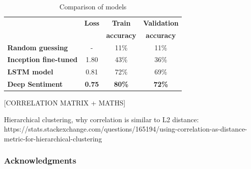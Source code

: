 \documentclass{article} %
\begin{document}
\begin{table}[H]
\caption{Comparison of models}
\begin{center}
    \begin{tabular}{ l | c | c | c}
    & \textbf{Loss} & \textbf{Train} & \textbf{Validation} \\
    & & \textbf{accuracy} & \textbf{accuracy} \\ \hline
    \textbf{Random guessing} & - & 11\% & 11\% \\ \hline
    \textbf{Inception fine-tuned}  & 1.80 & 43\% & 36\% \\ \hline
    \textbf{LSTM model} & 0.81 & 72\% & 69\% \\ \hline
    \textbf{Deep Sentiment} & \textbf{0.75} & \textbf{80\%} & \textbf{72\%} \\
    \end{tabular}
\end{center} 
\label{all-results}
\end{table}

[CORRELATION MATRIX + MATHS]

Hierarchical clustering, why correlation is similar to L2 distance: https://stats.stackexchange.com/questions/165194/using-correlation-as-distance-metric-for-hierarchical-clustering

\subsubsection*{Acknowledgments}



\end{document}
